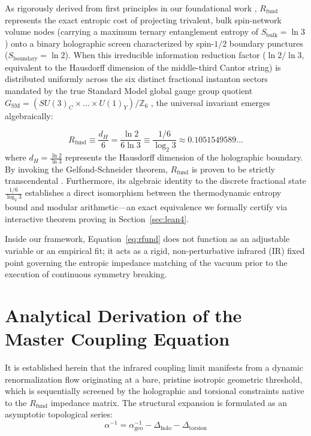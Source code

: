 \documentclass[12pt,a4paper]{article}
\begin{document}
As rigorously derived from first principles in our foundational work \cite{peinador2026_foundational}, $R_{\text{fund}}$ represents the exact entropic cost of projecting trivalent, bulk spin-network volume nodes (carrying a maximum ternary entanglement entropy of $S_{\text{bulk}} = \ln 3$) onto a binary holographic screen characterized by spin-$1/2$ boundary punctures ($S_{\text{boundary}} = \ln 2$). When this irreducible information reduction factor ($\ln 2 / \ln 3$, equivalent to the Hausdorff dimension of the middle-third Cantor string) is distributed uniformly across the six distinct fractional instanton sectors mandated by the true Standard Model global gauge group quotient $G_{\text{SM}} = (SU(3)_C \times \dots \times U(1)_Y) / \mathbb{Z}_6$ \cite{aharony2013}, the universal invariant emerges algebraically:

\begin{equation}
R_{\text{fund}} \equiv \frac{d_H}{6} = \frac{\ln 2}{6 \ln 3} \equiv \frac{1/6}{\log_2 3} \approx 0.1051549589\dots
\label{eq:rfund}
\end{equation}
where $d_H = \frac{\ln 2}{\ln 3}$ represents the Hausdorff dimension of the holographic boundary. By invoking the Gelfond-Schneider theorem, $R_{\text{fund}}$ is proven to be strictly transcendental \cite{peinador2026_foundational}. Furthermore, its algebraic identity to the discrete fractional state $\frac{1/6}{\log_2 3}$ establishes a direct isomorphism between the thermodynamic entropy bound and modular arithmetic—an exact equivalence we formally certify via interactive theorem proving in Section~\ref{sec:lean4}.

Inside our framework, Equation~\eqref{eq:rfund} does not function as an adjustable variable or an empirical fit; it acts as a rigid, non-perturbative infrared (IR) fixed point governing the entropic impedance matching of the vacuum prior to the execution of continuous symmetry breaking.


\section{Analytical Derivation of the Master Coupling Equation}

It is established herein that the infrared coupling limit manifests from a dynamic renormalization flow originating at a bare, pristine isotropic geometric threshold, which is sequentially screened by the holographic and torsional constraints native to the $R_{\text{fund}}$ impedance matrix. The structural expansion is formulated as an asymptotic topological series:
\begin{equation}
\alpha^{-1} = \alpha^{-1}_{\text{geo}} - \Delta_{\text{holo}} - \Delta_{\text{torsion}}
\end{equation}
\end{document}
